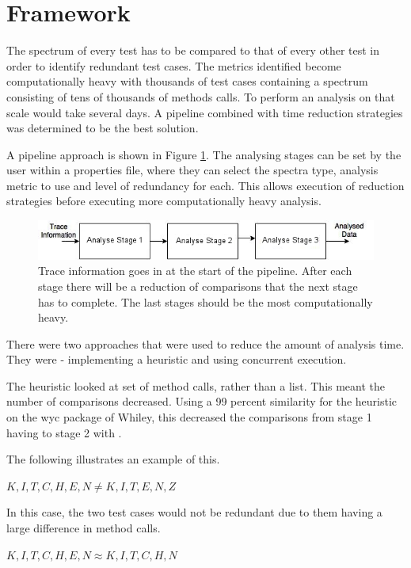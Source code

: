 \section{Framework}
\label{S:framework}

The spectrum of every test has to be compared to that of every other test in order to identify redundant test cases. The metrics identified become computationally heavy with thousands of test cases containing a spectrum consisting of tens of thousands of methods calls. To perform an analysis on that scale would take several days. A pipeline combined with time reduction strategies was determined to be the best solution.

A pipeline approach is shown in Figure \ref{fig:pipeline}. The analysing stages can be set by the user within a properties file, where they can select the spectra type, analysis metric to use and level of redundancy for each. This allows execution of reduction strategies before executing more computationally heavy analysis.

\begin{figure}[h]
\includegraphics[width=\textwidth]{Pipeline.jpg}
\caption{Trace information goes in at the start of the pipeline. After each stage there will be a reduction of comparisons that the next stage has to complete. The last stages should be the most computationally heavy.}
\label{fig:pipeline}
\end{figure}

There were two approaches that were used to reduce the amount of analysis time. They were - implementing a heuristic and using concurrent execution. 

The heuristic looked at set of method calls, rather than a list. This meant the number of comparisons decreased. Using a 99 percent similarity for the heuristic on the wyc package of Whiley, this decreased the comparisons from stage 1 having  to stage 2 with . 

The following illustrates an example of this.

$K,I,T,C,H,E,N \neq K,I,T,E,N,Z $

In this case, the two test cases would not be redundant due to them having a large difference in method calls.

$K,I,T,C,H,E,N \approx K,I,T,C,H,N$

